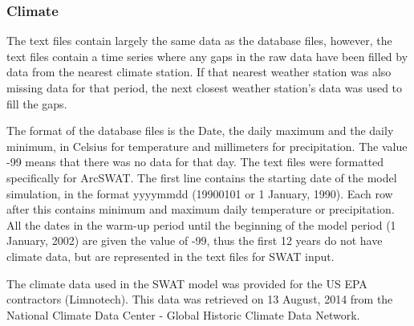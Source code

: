 \subsubsection{Climate}	


The text files contain largely the same data as the database files, however, the text files contain a time series where any gaps in the raw data have been filled by data from the nearest climate station. If that nearest weather station was also missing data for that period, the next closest weather station's data was used to fill the gaps. 

The format of the database files is the Date, the daily maximum and the daily minimum, in Celsius for temperature and millimeters for precipitation. The value -99 means that there was no data for that day. The text files were formatted specifically for ArcSWAT. The first line contains the starting date of the model simulation, in the format yyyymmdd (19900101 or 1 January, 1990). Each row after this contains minimum and maximum daily temperature or precipitation. All the dates in the warm-up period until the beginning of the model period (1 January, 2002) are given the value of -99, thus the first 12 years do not have climate data, but are represented in the text files for SWAT input. 

The climate data used in the SWAT model was provided for the US EPA contractors (Limnotech). This data was retrieved on 13 August, 2014 from the National Climate Data Center - Global Historic Climate Data Network.

